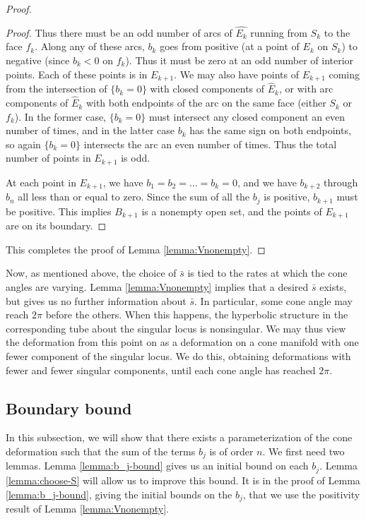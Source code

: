 \begin{proof}
\begin{proof}
Thus there must be an odd number of arcs of $\hat{E_k}$ running from
$S_k$ to the face $f_k$.  Along any of these arcs, $b_k$ goes from
positive (at a point of $E_k$ on $S_k$) to negative (since $b_k<0$ on
$f_k$).  Thus it must be zero at an odd number of interior points.
Each of these points is in $E_{k+1}$.  We may also have points of
$E_{k+1}$ coming from the intersection of $\{b_k=0\}$ with closed
components of $\hat{E}_k$, or with arc components of $\hat{E}_k$ with
both endpoints of the arc on the same face (either $S_k$ or $f_k$).
In the former case, $\{b_k=0\}$ must intersect any closed component an
even number of times, and in the latter case $b_k$ has the same sign
on both endpoints, so again $\{b_k=0\}$ intersects the arc an even
number of times.  Thus the total number of points in $E_{k+1}$ is odd.

At each point in $E_{k+1}$, we have $b_1=b_2=\dots=b_k=0$, and we have
$b_{k+2}$ through $b_n$ all less than or equal to zero.  Since the sum
of all the $b_j$ is positive, $b_{k+1}$ must be positive.  This
implies $B_{k+1}$ is a nonempty open set, and the points of $E_{k+1}$
are on its boundary.
\end{proof}

This completes the proof of Lemma \ref{lemma:Vnonempty}.
\end{proof}

Now, as mentioned above, the choice of $\bar{s}$ is tied to the rates
at which the cone angles are varying.  Lemma \ref{lemma:Vnonempty}
implies that a desired $\bar{s}$ exists, but gives us no further
information about $\bar{s}$.  In particular, some cone angle may reach
$2\pi$ before the others.  When this happens, the hyperbolic structure
in the corresponding tube about the singular locus is nonsingular.  We
may thus view the deformation from this point on as a deformation on a
cone manifold with one fewer component of the singular locus.  We do
this, obtaining deformations with fewer and fewer singular components,
until each cone angle has reached $2\pi$.




\subsection{Boundary bound}
\label{subsec:bd}

In this subsection, we will show that
there exists a parameterization of the cone deformation such that the
sum of the terms $b_j$ is of order $n$.  We first need two lemmas.
Lemma \ref{lemma:b_j-bound} gives us an initial bound on each $b_j$.
Lemma \ref{lemma:choose-S} will allow us to improve this bound.  It is
in the proof of Lemma \ref{lemma:b_j-bound}, giving the initial bounds
on the $b_j$, that we use the positivity result of Lemma
\ref{lemma:Vnonempty}.

